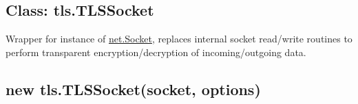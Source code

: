 \begin{Shaded}
\begin{Highlighting}[]
 \NormalTok{(}\NormalTok{);}
 \NormalTok{(}\NormalTok{);}

 
  \NormalTok{: }\NormalTok{(}\NormalTok{)}
\NormalTok{\};}

 \NormalTok{(}\NormalTok{() \{}
  \NormalTok{(}\NormalTok{,}
                \NormalTok{: }\NormalTok{);}
  \NormalTok{();}
\NormalTok{\});}
\NormalTok{(}\NormalTok{);}
\NormalTok{(}\NormalTok{, }
\NormalTok{\});}
\NormalTok{(}\NormalTok{, }\NormalTok{() \{}
  \NormalTok{();}
\NormalTok{\});}
\end{Highlighting}
\end{Shaded}

\subsection{Class: tls.TLSSocket}\label{class-tls.tlssocket}

Wrapper for instance of
\href{net.html\#net_class_net_socket}{net.Socket}, replaces internal
socket read/write routines to perform transparent encryption/decryption
of incoming/outgoing data.

\subsection{new tls.TLSSocket(socket,
options)}\label{new-tls.tlssocketsocket-options}

